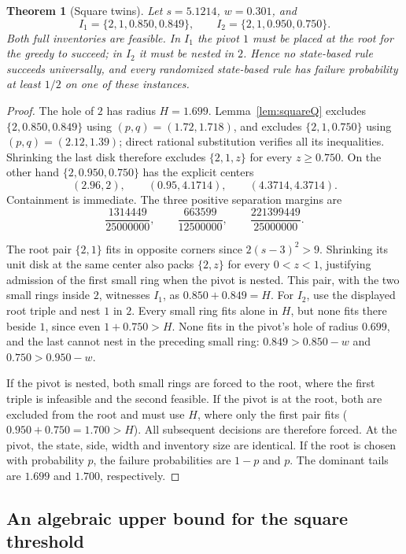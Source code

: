 \documentclass[11pt]{article}
\newtheorem{theorem}{Theorem}
\theoremstyle{definition}
\begin{document}
\begin{theorem}[Square twins]\label{thm:squaretwins}
Let $s=5.1214$, $w=0.301$, and
\[
 I_1=\{2,1,0.850,0.849\},\qquad
 I_2=\{2,1,0.950,0.750\}.
\]
Both full inventories are feasible. In $I_1$ the pivot $1$ must be
placed at the root for the greedy to succeed; in $I_2$ it must be
nested in $2$. Hence no state-based rule succeeds universally, and
every randomized state-based rule has failure probability at least
$1/2$ on one of these instances.
\end{theorem}
\begin{proof}
The hole of $2$ has radius $H=1.699$. Lemma~\ref{lem:squareQ}
excludes $\{2,0.850,0.849\}$ using $(p,q)=(1.72,1.718)$, and
excludes $\{2,1,0.750\}$ using $(p,q)=(2.12,1.39)$; direct rational
substitution verifies all its inequalities. Shrinking the last disk
therefore excludes $\{2,1,z\}$ for every $z\ge0.750$.
On the other hand $\{2,0.950,0.750\}$ has the explicit centers
\[
 (2.96,2),\qquad(0.95,4.1714),\qquad(4.3714,4.3714).
\]
Containment is immediate. The three positive separation margins are
\[
\frac{1314449}{25000000},\qquad\frac{663599}{12500000},\qquad
\frac{221399449}{25000000}.
\]

The root pair $\{2,1\}$ fits in opposite corners since
$2(s-3)^2>9$. Shrinking its unit disk at the same center also
packs $\{2,z\}$ for every $0<z<1$, justifying admission of the
first small ring when the pivot is nested.
This pair, with the two small rings inside $2$,
witnesses $I_1$, as $0.850+0.849=H$.
For $I_2$, use the displayed root triple and nest $1$ in $2$.
Every small ring fits alone in $H$, but none fits there beside $1$,
since even $1+0.750>H$. None fits in the pivot's hole of radius
$0.699$, and the last cannot nest in the preceding small ring:
$0.849>0.850-w$ and $0.750>0.950-w$.

If the pivot is nested, both small rings are forced to the root,
where the first triple is infeasible and the second feasible.
If the pivot is at the root, both are excluded from the root and
must use $H$, where only the first pair fits
($0.950+0.750=1.700>H$). All subsequent decisions are therefore
forced. At the pivot, the state, side, width and inventory size are
identical. If the root is chosen with probability $p$, the failure
probabilities are $1-p$ and $p$. The dominant tails are $1.699$ and
$1.700$, respectively.
\end{proof}

\subsection{An algebraic upper bound for the square threshold}
\label{sec:squarelimit}
\end{document}
